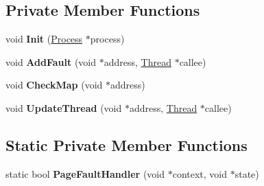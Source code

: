 \subsection*{Private Member Functions}
\begin{DoxyCompactItemize}
\item 
\mbox{\label{class_virtual_memory_a18e03310f784920d8b1ba6157b80720e}} 
void {\bfseries Init} (\hyperlink{class_process}{Process} $\ast$process)
\item 
\mbox{\label{class_virtual_memory_a24013e535d46964503670eccebf75199}} 
void {\bfseries Add\+Fault} (void $\ast$address, \hyperlink{class_thread}{Thread} $\ast$callee)
\item 
\mbox{\label{class_virtual_memory_a1b8e9d6e0629783798c8bb71e5931474}} 
void {\bfseries Check\+Map} (void $\ast$address)
\item 
\mbox{\label{class_virtual_memory_a1abc53b58726dadc393825c1e60f3300}} 
void {\bfseries Update\+Thread} (void $\ast$address, \hyperlink{class_thread}{Thread} $\ast$callee)
\end{DoxyCompactItemize}
\subsection*{Static Private Member Functions}
\begin{DoxyCompactItemize}
\item 
\mbox{\label{class_virtual_memory_a54879c2253d25aa811d11943a7377938}} 
static bool {\bfseries Page\+Fault\+Handler} (void $\ast$context, void $\ast$state)
\end{DoxyCompactItemize}
